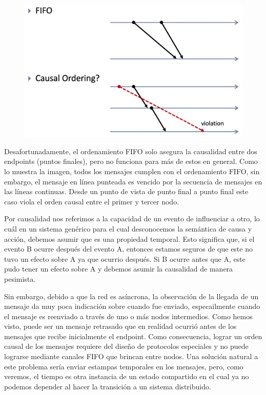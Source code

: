 \documentclass[12pt]{article}
\begin{document}
\begin{figure}[h]
   \centering
   \includegraphics[scale=0.5]{fifo_ordenamiento.png}
\end{figure}
 
Desafortunadamente, el ordenamiento FIFO solo asegura la causalidad entre dos endpoints (puntos finales), 
pero no funciona para más de estos en general.
Como lo muestra la imagen,
todos los mensajes cumplen con el ordenamiento FIFO,
sin embargo,
el mensaje en línea punteada es vencido por la secuencia de mensajes en las líneas continuas.
Desde un punto de vista de punto final a punto final este caso viola el orden causal entre el primer y tercer nodo.

Por causalidad nos referimos a la capacidad de un evento de influenciar a otro, 
lo cuál  en un sistema genérico para el cual desconocemos la semántica de causa y acción, 
debemos asumir que es una propiedad temporal.
Esto significa que, 
si el evento B ocurre después del evento A,
entonces estamos seguros de que este no tuvo un efecto sobre A ya que ocurrio después.
Si B ocurre antes que A,
este pudo tener un efecto sobre A y debemos asumir la causalidad de manera pesimista. 

Sin embargo,
debido a que la red es asíncrona, 
la observación de la llegada de un mensaje da muy poca indicación
sobre cuando fue enviado,
especailmente cuando el mensaje es reenviado a través de uno o más nodos intermedios.
Como hemos visto, puede ser un mensaje retrasado que en realidad ocurrió antes de los mensajes que recibe inicialmente el endpoint.
Como consecuencia,
lograr un orden causal de los mensajes requiere del diseño de protocolos especiales y no puede lograrse mediante canales FIFO que brincan entre nodos. Una solución natural a este problema sería enviar estampas temporales en los mensajes, pero,
como veremos, 
el tiempo es otra instancia de un estado compartido en el cual ya no podemos depender al hacer la transición a un sistema distribuido.
\end{document}
